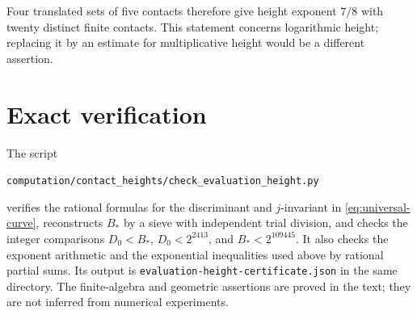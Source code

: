 \documentclass[11pt,a4paper]{article}
\theoremstyle{definition}
\begin{document}
Four translated sets of five contacts therefore give height exponent
$7/8$ with twenty distinct finite contacts. This statement concerns
logarithmic height; replacing it by an estimate for multiplicative
height would be a different assertion.

\section{Exact verification}\label{sec:verification}

The script
\begin{center}\small
\nolinkurl{computation/contact_heights/check_evaluation_height.py}
\end{center}
verifies the rational formulas for the discriminant and $j$-invariant
in \eqref{eq:universal-curve}, reconstructs $B_*$ by a sieve with
independent trial division, and checks the integer comparisons
$D_0<B_*$, $D_0<2^{2413}$, and $B_*<2^{109445}$.
It also checks the exponent arithmetic and the exponential
inequalities used above by rational partial sums.
Its output is
\nolinkurl{evaluation-height-certificate.json} in the same directory.
The finite-algebra and geometric assertions are proved in the text;
they are not inferred from numerical experiments.
\end{document}
